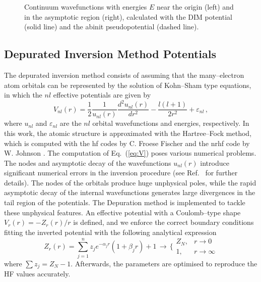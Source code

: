 \documentclass[10pt]{article}
\begin{document}
\begin{figure}[H]
 \caption{Continuum wavefunctions with energies $E$ near the origin 
 (left) and in the asymptotic region (right), calculated with the 
 DIM potential (solid line) and the {\sc abinit} pseudopotential (dashed 
 line). }
 \label{fig:contLi}
\end{figure}

\subsection{Depurated Inversion Method Potentials}
\label{sec:DIM}

The depurated inversion method \cite{Mendez2015,Mendez2016,Mendez2018} 
consists of assuming that the many--electron atom orbitals can be 
represented by the solution of Kohn--Sham type equations, in which 
the $nl$ effective potentials are given by 
\begin{equation}
V_{nl}(r) = 
\frac{1}{2}\frac{1}{u_{nl}(r)}
\frac{d^2u_{nl}(r)}{dr^{2}} - 
\frac{l(l+1)}{2r^{2}}+\varepsilon_{nl} \, ,
\label{eq:V}
\end{equation}
where $u_{nl}$ and $\varepsilon_{nl}$ are the $nl$ orbital wavefunctions and
energies, respectively. In this work, the atomic structure is
approximated with the Hartree--Fock method, 
which is computed with the {\sc hf} codes by 
C. Froese Fischer \cite{FroeseFischer1997} and the {\sc nrhf} code by 
W. Johnson \cite{Johnson2007}. The computation of Eq.~(\ref{eq:V}) 
poses various numerical problems. The nodes and asymptotic decay
of the wavefunctions $u_{nl}(r)$ introduce significant numerical errors in
the inversion procedure (see Ref.~\cite{Mendez2018} for further 
details). The nodes of the orbitals produce huge unphysical 
poles, while the rapid asymptotic decay of the internal wavefunctions 
generates large divergences in the tail region of the potentials.
The Depuration method is implemented to tackle these unphysical features. 
An effective potential with a Coulomb--type shape $V_r(r)=-Z_r(r)/r$ 
is defined, and we enforce the correct boundary 
conditions fitting the inverted potential with the following analytical 
expression
\begin{equation}
 Z_r(r) = \sum_{j=1}^n z_j e^{-\alpha_j r}(1+\beta_jr) + 1
 \, \longrightarrow \, \bigg\{
 \begin{array}{cc}
  Z_N, & r\rightarrow0 \\
  1, & r\rightarrow\infty 
 \end{array}
 \label{eq:atomiczDIM}
\end{equation} 
where \mbox{$\sum z_j = Z_N-1$}. Afterwards, the parameters are 
optimised to reproduce the HF values accurately. 
\end{document}
